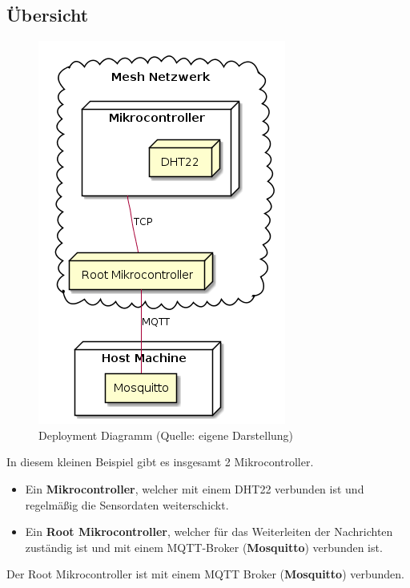 \subsection{Übersicht}

\vspace*{50px}
\begin{figure}[H]
    \begin{center}
        \includegraphics[scale=.5]{diagrams/mqtt_dht22_example_deployment.png}
        \caption{Deployment Diagramm (Quelle: eigene Darstellung)}
        \label{abb:dht22_deployment_diagram}
    \end{center}    
\end{figure}

In diesem kleinen Beispiel gibt es insgesamt 2 Mikrocontroller. 

\begin{itemize}
    \item Ein \textbf{Mikrocontroller}, welcher mit einem DHT22 verbunden ist und regelmäßig die Sensordaten weiterschickt.
    \item Ein \textbf{Root Mikrocontroller}, welcher für das Weiterleiten der Nachrichten zuständig ist und mit einem MQTT-Broker (\textbf{Mosquitto}) verbunden ist.
\end{itemize}

Der Root Mikrocontroller ist mit einem MQTT Broker (\textbf{Mosquitto}) verbunden.

